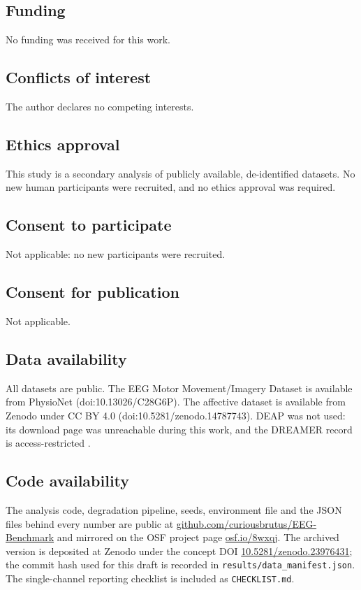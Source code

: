 \documentclass[11pt,a4paper]{article}
\begin{document}
\subsection*{Funding}
No funding was received for this work.

\subsection*{Conflicts of interest}
The author declares no competing interests.

\subsection*{Ethics approval}
This study is a secondary analysis of publicly available, de-identified datasets. No new
human participants were recruited, and no ethics approval was required.

\subsection*{Consent to participate}
Not applicable: no new participants were recruited.

\subsection*{Consent for publication}
Not applicable.

\subsection*{Data availability}
All datasets are public. The EEG Motor Movement/Imagery Dataset is available from
PhysioNet (doi:10.13026/C28G6P). The affective dataset is available from Zenodo under
CC BY 4.0 (doi:10.5281/zenodo.14787743). DEAP was not used: its download page was
unreachable during this work, and the DREAMER record is access-restricted
\citep{katsigiannis2018dreamer}.

\subsection*{Code availability}
The analysis code, degradation pipeline, seeds, environment file and the JSON files behind
every number are public at
\href{https://github.com/curiousbrutus/EEG-Benchmark}{github.com/curiousbrutus/EEG-Benchmark}
and mirrored on the OSF project page \href{https://osf.io/8wxqj/}{osf.io/8wxqj}. The
archived version is deposited at Zenodo under the concept DOI
\href{https://doi.org/10.5281/zenodo.23976431}{10.5281/zenodo.23976431}; the commit hash
used for this draft is recorded in \texttt{results/data\_manifest.json}. The single-channel
reporting checklist is included as \texttt{CHECKLIST.md}.
\end{document}
